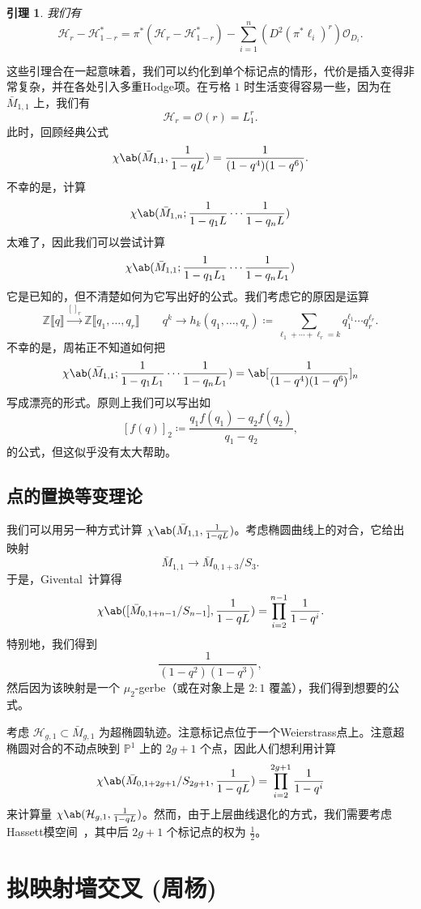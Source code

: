 \documentclass{amsart}
\newtheorem{lem}[thm]{引理}
\theoremstyle{definition}
\theoremstyle{remark}
\theoremstyle{plain}
\theoremstyle{definition}
\theoremstyle{remark}
\newcommand{\Z}{\mathbb{Z}}
\renewcommand{\P}{\mathbb{P}}
\newcommand{\mc}[1]{\mathcal{#1}}
\newcommand{\1}{\mathbf{1}}
\newcommand{\2}{\mathbf{2}}
\newcommand{\3}{\mathbf{3}}
\newcommand{\ps}[1]{\llbracket #1 \rrbracket}
\begin{document}
\begin{lem}
    我们有
    \[ \mc{H}_r - \mc{H}_{1-r}^* = \pi^* (\mc{H}_r - \mc{H}_{1-r}^*) - \sum_{i=1}^n (D^2 (\pi^* \ell_i)^r) \mc{O}_{D_i}. \]
\end{lem}

这些引理合在一起意味着，我们可以约化到单个标记点的情形，代价是插入变得非常复杂，并在各处引入多重Hodge项。在亏格 \(1\) 时生活变得容易一些，因为在 \(\bar{M}_{1,1}\) 上，我们有
\[ \mc{H}_r = \mc{O}(r) = L_1^r. \]
此时，回顾经典公式
\[ \chi\ab(\bar{M}_{1,1}, \frac{1}{1-qL}) = \frac{1}{(1-q^4)(1-q^6)}. \]
不幸的是，计算
\[ \chi\ab(\bar{M}_{1,n}; \frac{1}{1-q_1 L} \cdots \frac{1}{1-q_n L}) \]
太难了，因此我们可以尝试计算
\[ \chi\ab(\bar{M}_{1,1}; \frac{1}{1-q_1 L_1} \cdots \frac{1}{1-q_n L_1})  \]
它是已知的，但不清楚如何为它写出好的公式。我们考虑它的原因是运算
\[ \Z\ps{q} \xrightarrow{[]_r} \Z\ps{q_1, \ldots, q_r} \qquad q^k \to h_k(q_1, \ldots, q_r) \coloneqq \sum_{\ell_1 + \cdots + \ell_r = k} q_1^{\ell_1} \cdots q_r^{\ell_r}. \]
不幸的是，周祐正不知道如何把
\[ \chi\ab(\bar{M}_{1,1}; \frac{1}{1-q_1 L_1} \cdots \frac{1}{1-q_n L_1}) = \ab[\frac{1}{(1-q^4)(1-q^6)}]_n \]
写成漂亮的形式。原则上我们可以写出如
\[ [f(q)]_2 \coloneqq \frac{q_1 f(q_1) - q_2 f(q_2)}{q_1 - q_2}, \]
的公式，但这似乎没有太大帮助。

\subsection{点的置换等变理论}%
\label{sub:Permutation-equivariant theory of a point}

我们可以用另一种方式计算 \(\chi\ab(\bar{M}_{1,1}, \frac{1}{1-q L})\)。考虑椭圆曲线上的对合，它给出映射
\[ \bar{M}_{1,1} \to \bar{M}_{0,1+3}/S_3. \]
于是，Givental~\cite{Givental2017K1}计算得
\[ \chi\ab([\bar{M}_{0,1+n-1}/S_{n-1}], \frac{1}{1-qL}) = \prod_{i=2}^{n-1} \frac{1}{1-q^i}. \]
特别地，我们得到
\[ \frac{1}{(1-q^2)(1-q^3)}, \]
然后因为该映射是一个 \(\mu_2\)-gerbe（或在对象上是 \(2:1\) 覆盖），我们得到想要的公式。

考虑 \(\mc{H}_{g,1} \subset \bar{M}_{g,1}\) 为超椭圆轨迹。注意标记点位于一个Weierstrass点上。注意超椭圆对合的不动点映到 \(\P^1\) 上的 \(2g+1\) 个点，因此人们想利用计算
\[ \chi\ab(\bar{M}_{0,1+2g+1}/S_{2g+1}, \frac{1}{1-q L}) = \prod_{i=2}^{2g+1} \frac{1}{1-q^i} \]
来计算量
\(\chi\ab(\mc{H}_{g,1}, \frac{1}{1-qL})\)。然而，由于上层曲线退化的方式，我们需要考虑Hassett模空间~\cite{Hassett2003}，其中后 \(2g+1\) 个标记点的权为 \(\frac{1}{2}\)。
\section{拟映射墙交叉 (周杨)}%
\label{sec:Quasimap wall-crossing (Yang Zhou)}
\end{document}
